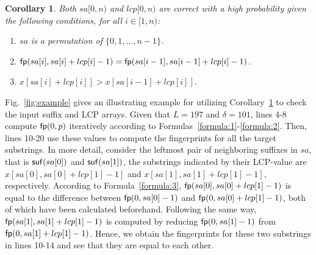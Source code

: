 \documentclass[10pt,journal,compsoc]{IEEEtran}
\newtheorem{Corollary}{Corollary}
\begin{document}
\begin{Corollary} \label{corollary:1}
	Both $sa[0, n)$ and $lcp[0, n)$ are correct with a high probability given the following conditions, for all $i \in [1, n)$:
	
	\begin{enumerate}[(1)]
		\item
		$sa$ is a permutation of $\{0, 1, \dots, n - 1\}$.
		
		\item
		${\sf fp}(sa[i], sa[i] + lcp[i] - 1) = {\sf fp}(sa[i - 1], sa[i - 1] + lcp[i] - 1)$.
		
		\item
		$x[sa[i] + lcp[i]] > x[sa[i - 1] + lcp[i]]$.
	\end{enumerate}
\end{Corollary}

Fig.~\ref{fig:example} gives an illustrating example for utilizing Corollary~\ref{corollary:1} to check the input suffix and LCP arrays. Given that $L = 197$ and $\delta = 101$, lines 4-8 compute ${\sf fp}(0, p)$ iteratively according to Formulas~\ref{formula:1}-\ref{formula:2}. Then, lines 10-20 use these values to compute the fingerprints for all the target substrings. In more detail, consider the leftmost pair of neighboring suffixes in $sa$, that is ${\sf suf}(sa[0])$ and ${\sf suf}(sa[1])$, the substrings indicated by their LCP-value are $x[sa[0], sa[0] + lcp[1] - 1]$ and $x[sa[1], sa[1] + lcp[1] - 1]$, respectively. According to Formula~\ref{formula:3}, ${\sf fp}(sa[0], sa[0] + lcp[1] - 1)$ is equal to the difference between ${\sf fp}(0, sa[0] - 1)$ and ${\sf fp}(0, sa[0] + lcp[1] - 1)$, both of which have been calculated beforehand. Following the same way, ${\sf fp}(sa[1], sa[1] + lcp[1] - 1)$ is computed by reducing ${\sf fp}(0, sa[1] - 1)$ from ${\sf fp}(0, sa[1] + lcp[1] - 1)$. Hence, we obtain the fingerprints for these two substrings in lines 10-14 and see that they are equal to each other. 
\end{document}
